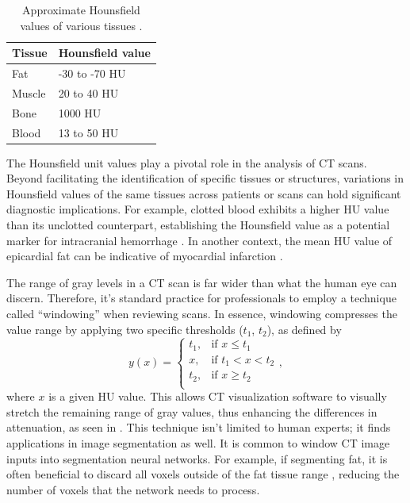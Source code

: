 \begin{table}[t!]
\centering
\def\arraystretch{1.2}
\begin{tabularx}{\textwidth}{X X}
 \textbf{Tissue} & \textbf{Hounsfield value} \\
 \hline
 Fat & -30 to -70 HU\\
 Muscle & 20 to 40 HU\\
 Bone & 1000 HU \\
 Blood & 13 to 50 HU\\
\end{tabularx}
\caption{Approximate Hounsfield values of various tissues \cite{fosbinder2011essentials, kamalianComputedTomographyImaging2016}.}
\label{tab:hu-tissues}
\end{table}

The Hounsfield unit values play a pivotal role in the analysis of CT scans. Beyond facilitating the identification of specific tissues or structures, variations in Hounsfield values of the same tissues across patients or scans can hold significant diagnostic implications. For example, clotted blood exhibits a higher HU value than its unclotted counterpart, establishing the Hounsfield value as a potential marker for intracranial hemorrhage \cite{kamalianComputedTomographyImaging2016}. In another context, the mean HU value of epicardial fat can be indicative of myocardial infarction \cite{mahabadiCardiacComputedTomographyderived2017}.

The range of gray levels in a CT scan is far wider than what the human eye can discern. Therefore, it's standard practice for professionals to employ a technique called ``windowing'' when reviewing scans. In essence, windowing compresses the value range by applying two specific thresholds ($t_1$, $t_2$), as defined by
\begin{equation}
y(x) = 
    \begin{cases}
        t_1, & \text{if } x \leq t_1\\
        x, & \text{if } t_1 < x < t_2\\
        	t_2, & \text{if } x \geq t_2\\
    \end{cases},
\end{equation}
where $x$ is a given HU value. This allows CT visualization software to visually stretch the remaining range of gray values, thus enhancing the differences in attenuation, as seen in . This technique isn't limited to human experts; it finds applications in image segmentation as well. It is common to window CT image inputs into segmentation neural networks. For example, if segmenting fat, it is often beneficial to discard all voxels outside of the fat tissue range \cite{bencevicRecentProgressEpicardial2022}, reducing the number of voxels that the network needs to process.

